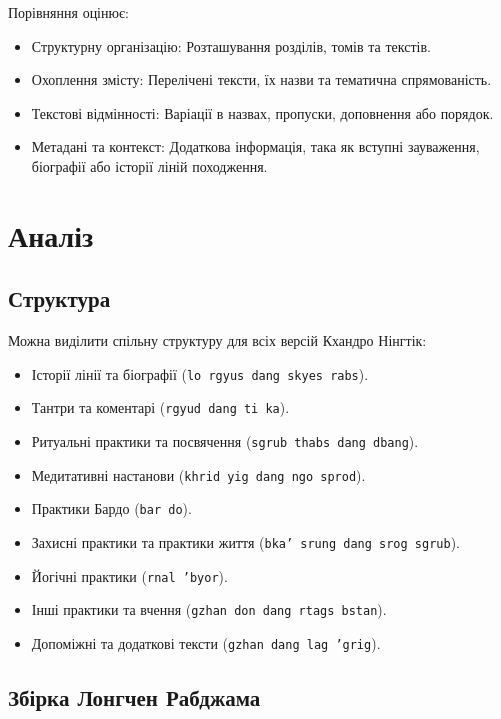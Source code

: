 \documentclass{article}
\begin{document}
Порівняння оцінює:

\begin{itemize}
\item Структурну організацію: Розташування розділів, томів та текстів.
\item Охоплення змісту: Перелічені тексти, їх назви та тематична спрямованість.
\item Текстові відмінності: Варіації в назвах, пропуски, доповнення або порядок.
\item Метадані та контекст: Додаткова інформація, така як вступні зауваження, біографії або історії ліній походження.
\end{itemize}

\newpage
\section{Аналіз}

\subsection{Структура}

Можна виділити спільну структуру для всіх версій Кхандро Нінгтік:

\begin{itemize}
\item Історії лінії та біографії (\texttt{lo rgyus dang skyes rabs}).
\item Тантри та коментарі (\texttt{rgyud dang ti ka}).
\item Ритуальні практики та посвячення (\texttt{sgrub thabs dang dbang}).
\item Медитативні настанови (\texttt{khrid yig dang ngo sprod}).
\item Практики Бардо (\texttt{bar do}).
\item Захисні практики та практики життя (\texttt{bka' srung dang srog sgrub}).
\item Йогічні практики (\texttt{rnal 'byor}).
\item Інші практики та вчення (\texttt{gzhan don dang rtags bstan}).
\item Допоміжні та додаткові тексти (\texttt{gzhan dang lag 'grig}).
\end{itemize}

\newpage
\subsection{Збірка Лонгчен Рабджама}
\end{document}
